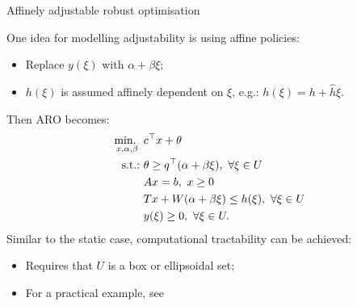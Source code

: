 \begin{frame}{Affinely adjustable robust optimisation {\small \cite{ben2004adjustable}}}

	One idea for modelling adjustability is using \alert{affine policies}:
	\vspace{-6pt}
	\begin{itemize}
		\item Replace $y(\xi)$ with $\alpha + \beta \xi$;
		\item $h(\xi)$ is assumed \alert{affinely dependent} on $\xi$, e.g.: $h(\xi)	 = h + \hat{h}\xi$.
	\end{itemize}
	
	\pause
	Then ARO becomes:
	\begin{equation*}
	\begin{aligned}
		\mini_{x, \alpha, \beta}~  & c^\top x + \theta  \\
		\text{s.t.:~}  & \theta \ge q^\top (\alpha + \beta \xi), \ \forall \xi \in U \\
			   & Ax = b, \ x \ge 0 \\
			   & Tx + W(\alpha + \beta \xi) \le h(\xi), \ \forall \xi \in U \\
			   & y(\xi) \ge 0, \ \forall \xi \in U.
	\end{aligned}
	\end{equation*}
	\pause
	Similar to the static case, computational \alert{tractability} can be achieved:
		\vspace{-6pt}
		\begin{itemize}
			\item Requires that $U$ is a box or ellipsoidal set;
			\item For a practical example, see {\small \cite{ben2005retailer}}	
		\end{itemize}
   
\end{frame}


